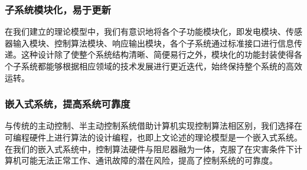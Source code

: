 \subsubsection{子系统模块化，易于更新}
在我们建立的理论模型中，我们有意识地将各个子功能模块化，即发电模块、传感器输入模块、控制算法模块、响应输出模块，各个子系统通过标准接口进行信息传递。这种设计除了使整个系统结构清晰、简便易行之外，模块化的功能封装使得各个子系统都能够根据相应领域的技术发展进行更近迭代，始终保持整个系统的高效运转。

\subsubsection{嵌入式系统，提高系统可靠度}
与传统的主动控制、半主动控制系统借助计算机实现控制算法相区别，我们选择在可编程硬件上进行算法的设计编程，也即上文论述的理论模型是一个嵌入式系统。在我们的嵌入式系统中，控制算法硬件与阻尼器融为一体，克服了在灾害条件下计算机可能无法正常工作、通讯故障的潜在风险，提高了控制系统的可靠度。
